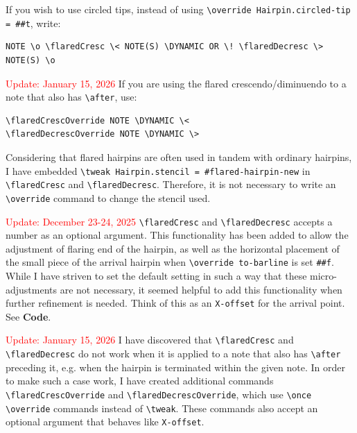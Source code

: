 If you wish to use circled tips, instead of using \verb|\override Hairpin.circled-tip = ##t|, write:

\begin{verbatim}
NOTE \o \flaredCresc \< NOTE(S) \DYNAMIC OR \! \flaredDecresc \> NOTE(S) \o
\end{verbatim}

\textcolor{red}{Update: January 15, 2026 } If you are using the flared crescendo/diminuendo to a note that also has \verb|\after|, use:

\begin{verbatim}
\flaredCrescOverride NOTE \DYNAMIC \< 
\flaredDecrescOverride NOTE \DYNAMIC \>
\end{verbatim}

Considering that flared hairpins are often used in tandem with ordinary hairpins, I have embedded \verb|\tweak Hairpin.stencil = #flared-hairpin-new| in \verb|\flaredCresc| and \verb|\flaredDecresc|. Therefore, it is not necessary to write an \verb|\override| command to change the stencil used.

\textcolor{red}{Update: December 23-24, 2025 } \verb|\flaredCresc| and \verb|\flaredDecresc| accepts a number as an optional argument. This functionality has been added to allow the adjustment of flaring end of the hairpin, as well as the horizontal placement of the small piece of the arrival hairpin when \verb|\override to-barline| is set \verb|##f|. While I have striven to set the default setting in such a way that these micro-adjustments are not necessary, it seemed helpful to add this functionality when further refinement is needed. Think of this as an \verb|X-offset| for the arrival point. See \textbf{Code}. 


\textcolor{red}{Update: January 15, 2026 } I have discovered that \verb|\flaredCresc| and \verb|\flaredDecresc| do not work when it is applied to a note that also has \verb|\after| preceding it, e.g. when the hairpin is terminated within the given note. In order to make such a case work, I have created additional commands \verb|\flaredCrescOverride| and  \verb|\flaredDecrescOverride|, which use \verb|\once \override| commands instead of \verb|\tweak|. These commands also accept an optional argument that behaves like \verb|X-offset|. 


